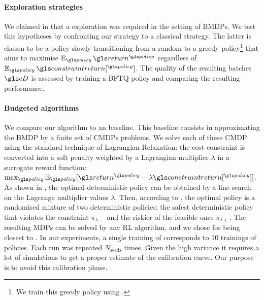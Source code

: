 \paragraph{Exploration strategies} We claimed in  that a  exploration was required in the setting of \glspl{BMDP}. We test this hypotheses by confronting our strategy to a classical  strategy. The latter is chosen to be a  policy slowly transitioning from a random to a greedy policy\footnote{We train this greedy policy using \FTQ.} that aims to maximise $\expectedvalue_{\policy} \return^{\policy}$ regardless of $\expectedvalue_{\policy} \constraintreturn[^{\policy}]$. The quality of the resulting batches $\cD$ is assessed by training a \gls{BFTQ} policy and comparing the resulting performance.

\paragraph{Budgeted algorithms} We compare our \BFTQ algorithm to an \FTQl baseline. This baseline consists in approximating the BMDP by a finite set of CMDPs problems. We solve each of these CMDP using the standard technique of Lagrangian Relaxation: the cost constraint is converted into a soft penalty weighted by a Lagrangian multiplier $\lambda$ in a surrogate reward function: $\max_{\policy} \expectedvalue_{\policy}[\return^{\policy} - \lambda \constraintreturn[^{\policy}]]$.
As shown in , the optimal deterministic policy can be obtained by a line-search on the Lagrange multiplier values $\lambda$.
Then, according to \citet[Theorem 4.4]{Beutler1985}, the optimal policy is a randomised mixture of two deterministic policies: the safest deterministic policy that violates the constraint $\pi_{\lambda-}$ and the riskier of the feasible ones $\pi_{\lambda+}$.
The resulting \glspl{MDP} can be solved by any RL algorithm, and we chose \FTQ for being closest to \BFTQ.
In our experiments, a single training of \BFTQ corresponds to 10 trainings of \FTQl policies. Each run was repeated $N_{\text{seeds}}$ times. Given the high variance it requires a lot of simulations to get a proper estimate of the calibration curve. Our purpose is to avoid this calibration phase.

